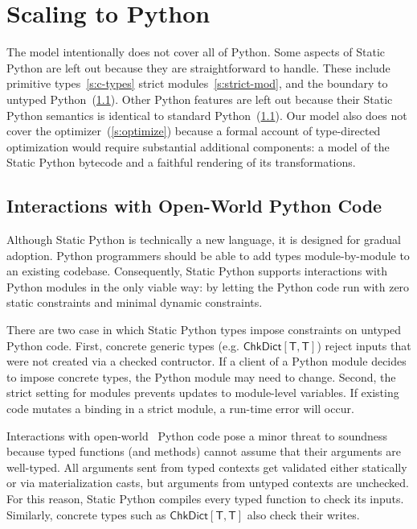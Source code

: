 \documentclass[english,cleveref,submission]{programming}
\newcommand{\SP}{Static Python}
\newcommand{\typefont}[1]{\mathsf{#1}}
\newcommand{\paramtype}[2]{#1[#2]}
\newcommand{\sptype}{\typefont{T}}
\newcommand{\sptchkdict}[2]{\paramtype{\typefont{ChkDict}}{#1, #2}}
\begin{document}
\section{Scaling to Python}
\label{s:impl}

The model intentionally does not cover all of Python.
Some aspects of \SP{} are left out because they are straightforward to
handle.
These include primitive types~\cref{s:c-types} strict modules~\cref{s:strict-mod},
and the boundary to untyped Python~(\cref{s:py-boundary}).
Other Python features are left out because their \SP{} semantics is identical
to standard Python~(\cref{s:py-boundary}).
Our model also does not cover the optimizer~(\cref{s:optimize}) because
a formal account of type-directed optimization would require substantial additional
components: a model of the \SP{} bytecode and a faithful rendering of its
transformations.


\subsection{Interactions with Open-World Python Code}
\label{s:py-boundary}

Although \SP{} is technically a new language, it is designed for gradual adoption.
Python programmers should be able to add types module-by-module to an
existing codebase.
Consequently, \SP{} supports interactions with Python modules in the only viable
way: by letting the Python code run with zero static constraints and minimal
dynamic constraints.

There are two case in which \SP{} types impose constraints on untyped Python code.
First, concrete generic types (e.g. $\sptchkdict{\sptype}{\sptype}$)
reject inputs that were not created via a checked contructor.
If a client of a Python module decides to impose concrete types, the Python module
may need to change.
Second, the strict setting for modules prevents updates to module-level variables.
If existing code mutates a binding in a strict module, a run-time error will
occur.

Interactions with {open-world}~\cite{vss-popl-2017} Python code pose a minor
threat to soundness because
typed functions (and methods) cannot assume that their arguments are
well-typed.
All arguments sent from typed contexts get validated either statically or
via materialization casts, but arguments from untyped contexts are unchecked.
For this reason, \SP{} compiles every typed function to check its inputs.
Similarly, concrete types such as $\sptchkdict{\sptype}{\sptype}$ also
check their writes.
\end{document}
